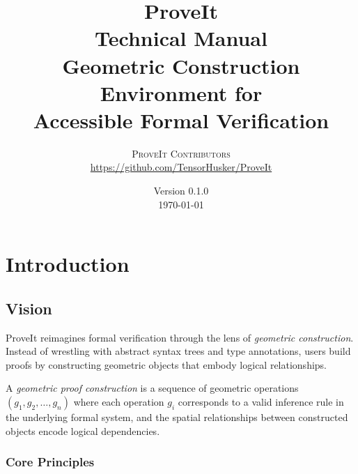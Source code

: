 \documentclass[11pt,a4paper,twoside]{report}
\title{
    \vspace{-2cm}
    {\Huge\sffamily\bfseries ProveIt}\\[0.5cm]
    {\Large\sffamily Technical Manual}\\[1cm]
    {\large Geometric Construction Environment for\\Accessible Formal Verification}
}
\author{
    \textsc{ProveIt Contributors}\\[0.3cm]
    \small\url{https://github.com/TensorHusker/ProveIt}
}
\date{
    Version 0.1.0\\[0.2cm]
    \today
}
\begin{document}
\maketitle
\thispagestyle{empty}

\clearpage
\tableofcontents
\clearpage
\listoffigures
\listoftables
\clearpage

\chapter{Introduction}
\label{chap:introduction}

\section{Vision}

ProveIt reimagines formal verification through the lens of \emph{geometric construction}. Instead of wrestling with abstract syntax trees and type annotations, users build proofs by constructing geometric objects that embody logical relationships.

\begin{definition}
\label{def:geometric-proof}
A \emph{geometric proof construction} is a sequence of geometric operations $(g_1, g_2, \ldots, g_n)$ where each operation $g_i$ corresponds to a valid inference rule in the underlying formal system, and the spatial relationships between constructed objects encode logical dependencies.
\end{definition}

\subsection{Core Principles}
\end{document}

